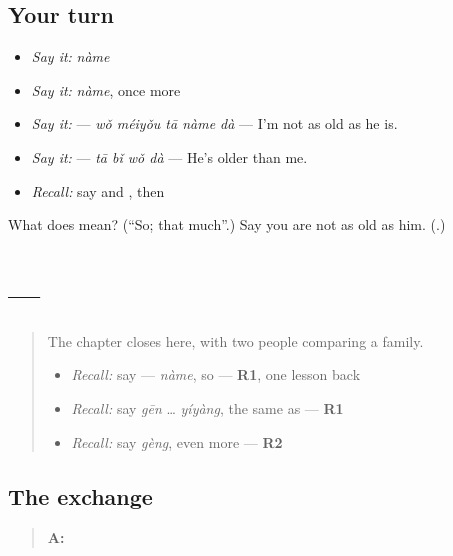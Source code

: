 \subsection*{Your turn}
\begin{itemize}
\raggedright
  \item \emph{Say it:} \emph{nàme}
  \item \emph{Say it:} \emph{nàme}, once more
  \item \emph{Say it:}  — \emph{wǒ méiyǒu tā nàme dà} — I'm not as old as he is.
  \item \emph{Say it:}  — \emph{tā bǐ wǒ dà} — He's older than me.
  \item \emph{Recall:} say  and , then 
\end{itemize}

\begin{tcolorbox}[breakable,colback=teal!4,colframe=teal!35!black,title={Before you move on}]
What does  mean? (\textquotedblleft{}So; that much\textquotedblright{}.) Say you are not as old as him. (\textbf{}.)
\end{tcolorbox}
\section[Practice]{ — }

\label{lesson:ZH-C153-practice}



\begin{quote}
The chapter closes here, with two people comparing a family.

\begin{itemize}
\raggedright
  \item \emph{Recall:} say  — \emph{nàme}, so — \textbf{R1}, one lesson back
  \item \emph{Recall:} say \emph{gēn} … \emph{yíyàng}, the same as — \textbf{R1}
  \item \emph{Recall:} say \emph{gèng}, even more — \textbf{R2}
\end{itemize}
\end{quote}

\subsection*{The exchange}
\begin{quote}
\textbf{A:} 
\end{quote}

